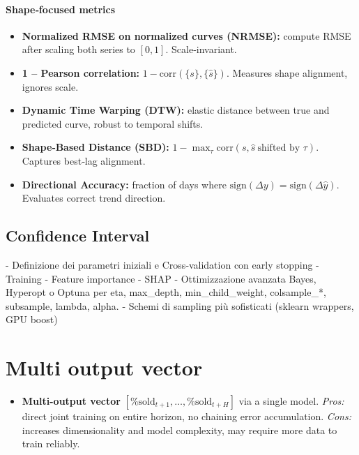 \documentclass[a4paper,12pt]{report}  %
\begin{document}
\paragraph{Shape‐focused metrics}
\begin{itemize}
  \item \textbf{Normalized RMSE on normalized curves (NRMSE):}
        compute RMSE after scaling both series to \([0,1]\). Scale‐invariant.
  \item \textbf{1 – Pearson correlation:}
        \(1 - \mathrm{corr}(\{s\},\{\hat s\})\). Measures shape alignment, ignores scale.
  \item \textbf{Dynamic Time Warping (DTW):}
        elastic distance between true and predicted curve, robust to temporal shifts.
  \item \textbf{Shape‐Based Distance (SBD):}
        \(1 - \max_\tau\mathrm{corr}(s, \hat s\ \text{shifted by }\tau)\). Captures best‐lag alignment.
  \item \textbf{Directional Accuracy:}
        fraction of days where \(\mathrm{sign}(\Delta y)=\mathrm{sign}(\Delta \hat y)\). Evaluates correct trend direction.
\end{itemize}


\subsection{Confidence Interval}
- Definizione dei parametri iniziali e Cross‐validation con early stopping
- Training
- Feature importance
- SHAP
- Ottimizzazione avanzata Bayes, Hyperopt o Optuna per eta, max_depth, min_child_weight, colsample_*, subsample, lambda, alpha.
- Schemi di sampling più sofisticati (sklearn wrappers, GPU boost)

\section{Multi output vector}
\begin{itemize}
  \item \textbf{Multi-output vector} \([\%\text{sold}_{t+1},\dots,\%\text{sold}_{t+H}]\) via a single model.
        \emph{Pros:} direct joint training on entire horizon, no chaining error accumulation.  
        \emph{Cons:} increases dimensionality and model complexity, may require more data to train reliably.
  \end{itemize}
\end{document}
